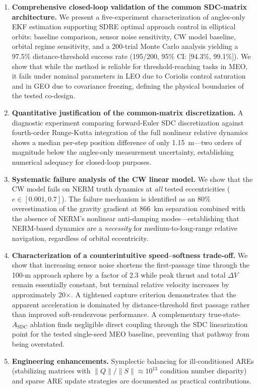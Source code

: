 \documentclass[preprint,3p,times]{elsarticle}
\begin{document}
\begin{enumerate}
    \item \textbf{Comprehensive closed-loop validation of the common SDC-matrix architecture.} We present a five-experiment characterization of angles-only EKF estimation supporting SDRE optimal approach control in elliptical orbits: baseline comparison, sensor noise sensitivity, CW model baseline, orbital regime sensitivity, and a 200-trial Monte Carlo analysis yielding a 97.5\% distance-threshold success rate (195/200, 95\% CI: [94.3\%, 99.1\%]). We show that while the method is reliable for threshold-reaching tasks in MEO, it fails under nominal parameters in LEO due to Coriolis control saturation and in GEO due to covariance freezing, defining the physical boundaries of the tested co-design.

    \item \textbf{Quantitative justification of the common-matrix discretization.} A diagnostic experiment comparing forward-Euler SDC discretization against fourth-order Runge-Kutta integration of the full nonlinear relative dynamics shows a median per-step position difference of only 1.15~m---two orders of magnitude below the angles-only measurement uncertainty, establishing numerical adequacy for closed-loop purposes.

    \item \textbf{Systematic failure analysis of the CW linear model.} We show that the CW model fails on NERM truth dynamics at \emph{all} tested eccentricities ($e \in [0.001, 0.7]$). The failure mechanism is identified as an 80\% overestimation of the gravity gradient at 866~km separation combined with the absence of NERM's nonlinear anti-damping modes---establishing that NERM-based dynamics are a \emph{necessity} for medium-to-long-range relative navigation, regardless of orbital eccentricity.

    \item \textbf{Characterization of a counterintuitive speed--softness trade-off.} We show that increasing sensor noise shortens the first-passage time through the 100-m approach sphere by a factor of 2.3 while peak thrust and total $\Delta V$ remain essentially constant, but terminal relative velocity increases by approximately 20$\times$. A tightened capture criterion demonstrates that the apparent acceleration is dominated by distance-threshold first passage rather than improved soft-rendezvous performance. A complementary true-state-$A_{\text{SDC}}$ ablation finds negligible direct coupling through the SDC linearization point for the tested single-seed MEO baseline, preventing that pathway from being overstated.

    \item \textbf{Engineering enhancements.} Symplectic balancing for ill-conditioned AREs (stabilizing matrices with $\|Q\|/\|S\| \approx 10^{13}$ condition number disparity) and sparse ARE update strategies are documented as practical contributions.
\end{enumerate}
\end{document}
